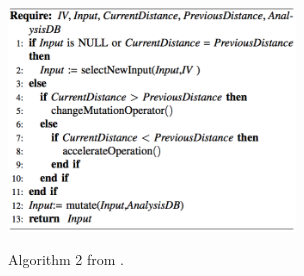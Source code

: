 \documentclass{sig-alternate-05-2015}
\begin{document}
\begin{figure}[!h]
\centering
\includegraphics[width=3in]{images/algorithm2.png}
\label{fig:algorithm2}
\caption{Algorithm 2 from \cite{alshahwan2011automated}.}
\end{figure}
\end{document}

